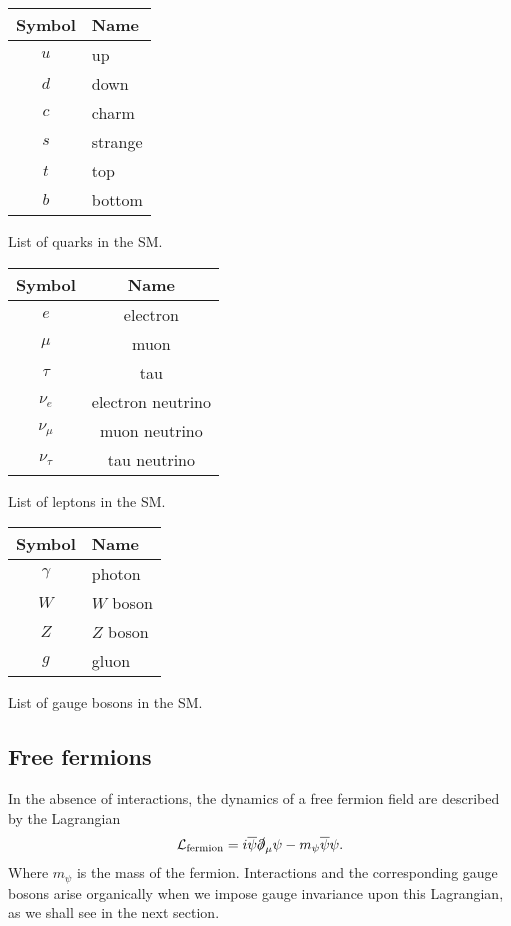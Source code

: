 \begin{margintable}[-10cm]
  \centering
  \begin{tabular}{c|l}
    Symbol & Name \\
  \hline
    $u$ & up\\
    $d$ & down \\
    $c$ & charm \\
    $s$ & strange \\
    $t$ & top \\
    $b$ & bottom \\
  \end{tabular}
  \caption{List of quarks in the SM.}
  \label{tab:quarks}
\end{margintable}

\begin{margintable}[-3cm]
  \centering
\begin{tabular}{c|c}
    Symbol & Name \\
  \hline
    $e$ & electron\\
    $\mu$ & muon \\
    $\tau$ & tau \\
    $\nu_e$ & electron neutrino \\
    $\nu_\mu$ & muon neutrino \\
    $\nu_\tau$ & tau neutrino \\
  \end{tabular}
  \caption{List of leptons in the SM.}
  \label{tab:leptons}
\end{margintable}

\begin{margintable}
  \centering
\begin{tabular}{c|l}
    Symbol & Name \\
  \hline
    $\gamma$ & photon\\
    $W$ & $W$ boson \\
    $Z$ & $Z$ boson \\
    $g$ & gluon \\
  \end{tabular}
  \caption{List of gauge bosons in the SM.}
  \label{tab:gaugebosons}
\end{margintable}

\subsection{Free fermions}
In the absence of interactions, the dynamics of a free fermion field \psi are described by the Lagrangian
\begin{align}
  \mathcal{L}_\text{fermion} = i\overline{\psi}\slashed{\partial}_\mu\psi-m_{\psi}\overline{\psi}\psi.
\label{eq:fermion_lagrangian}
\end{align}
Where $m_\psi$ is the mass of the fermion. Interactions and the corresponding gauge bosons arise organically when we impose gauge invariance upon this Lagrangian, as we shall see in the next section.

